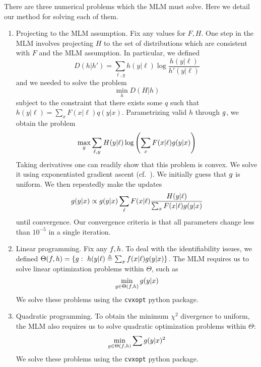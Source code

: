 \label{sec:optproblems}

There are three numerical problems which the MLM must solve.  Here we detail our method for solving each of them.

\begin{enumerate}

    \item Projecting to the MLM assumption.  Fix any values for $F,H$.  One step in the MLM involves projecting $H$ to the set of distributions which are consistent with $F$ and the MLM assumption.  In particular, we defined
    \[
    D(h|h') = \sum_{\ell,y} h(y|\ell) \log \frac{h(y|\ell)}{h'(y|\ell)}
    \]
    and we needed to solve the problem
    \[
    \min_{h} D(H|h)
    \]
    subject to the constraint that there exists some $q$ such that $h(y|\ell)=\sum_x F(x|\ell)q(y|x)$.  Parametrizing valid $h$ through $g$, we obtain the problem
    \[
    \max_{g} \sum_{\ell,y} H(y|\ell) \log \left(\sum_x F(x|\ell) g(y|x)\right)
    \]
    Taking derivatives one can readily show that this problem is convex.  We solve it using exponentiated gradient ascent (cf.\ \cite{kivinen1995additive}).  We initially guess that $g$ is uniform.  We then repeatedly make the updates
    \begin{align*}
    g(y|x)  &\propto g(y|x)\sum_{\ell}F(x|\ell)\frac{H(y|\ell)}{\sum_x F(x|\ell)g(y|x)}\\
    \end{align*}
    until convergence.  Our convergence criteria is that all parameters change less than $10^{-5}$ in a single iteration.

    \item Linear programming.  Fix any $f,h$.  To deal with the identifiability issues, we defined $\Theta(\plx,\ply)=\{\pxy:\ \ply(y|\ell) \triangleq \sum_x \plx(x|\ell)\pxy(y|x)\}$.  The MLM requires us to solve linear optimization problems within $\Theta$, such as 
    \[
    \min_{g\in \Theta(f,h)} g(y|x) \\
    \]
    We solve these problems using the {\tt cvxopt} python package.

    \item Quadratic programming.  To obtain the minimum $\chi^2$ divergence to uniform, the MLM also requires us to solve quadratic optimization problems within $\Theta$:
    \[
    \min_{g \in \Theta(f,h)} \sum g(y|x)^2 \\
    \]
    We solve these problems using the {\tt cvxopt} python package.


\end{enumerate}

